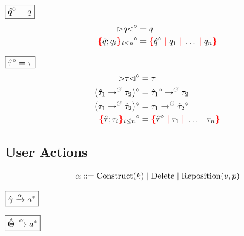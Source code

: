 \noindent $\boxed{\erase{\Z{q}} = q}$
%
\begin{align*}
  \erase{\cursor{q}} &= q \\
  \erase{\conflictHoleForm{\Z{q}; q_i}{i \leq n}} &= \conflictHole{\erase{\Z{q}}, q_1, \ldots, q_n}
\end{align*}

\noindent $\boxed{\erase{\Z{\tau}} = \tau}$
%
\begin{align*}
  \erase{\cursor{\tau}} &= \tau \\
  \erase{\left(\tArrow{G}{\Z{\tau}_1}{\tau_2}\right)} &= \tArrow{G}{\erase{\Z{\tau}_1}}{\tau_2} \\
  \erase{\left(\tArrow{G}{\tau_1}{\Z{\tau}_2}\right)} &= \tArrow{G}{\tau_1}{\erase{\Z{\tau}_2}} \\
  \erase{\conflictHoleForm{\Z{\tau}; \tau_i}{i \leq n}} &= \conflictHole{\erase{\Z{\tau}}, \tau_1, \ldots, \tau_n}
\end{align*}


\subsection{User Actions}


\[
  \arraycolsep=0pt
  \begin{array}{llll}
    \alpha & {}::={} &
      \Construct{k}
      \mid \Delete
      \mid \Reposition{v}{p}
    \\
  \end{array}
\]

\noindent $\boxed{\Z{\Grove} \userAction{\alpha} a^{*}}$
%
\begin{mathpar}


\end{mathpar}

\noindent $\boxed{\Z{\Set} \userAction{\alpha} a^{*}}$
%
\begin{mathpar}
\end{mathpar}

